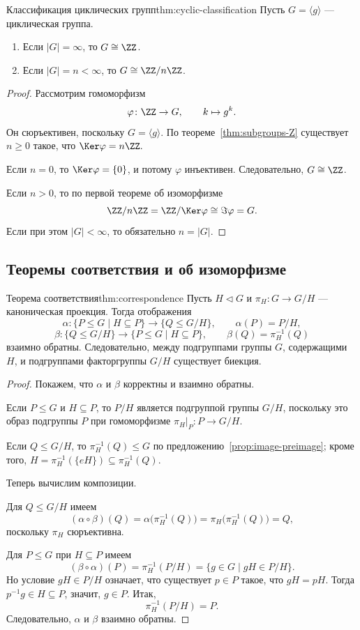 \begin{Theorem}{Классификация циклических групп}{thm:cyclic-classification}
	Пусть $G=\langle g\rangle$ --- циклическая группа.
	\begin{enumerate}
		\item Если $|G|=\infty$, то $G\cong \ZZ$.
		\item Если $|G|=n<\infty$, то $G\cong \ZZ/n\ZZ$.
	\end{enumerate}
\end{Theorem}

\begin{proof}
	Рассмотрим гомоморфизм
	\[
	\varphi\colon \ZZ \to G, \qquad k\mapsto g^k.
	\]
	Он сюръективен, поскольку $G=\langle g\rangle$. По теореме~\ref{thm:subgroups-Z} существует $n\ge 0$ такое, что $\Ker\varphi=n\ZZ.$

	Если $n=0$, то $\Ker\varphi=\{0\}$, и потому $\varphi$ инъективен. Следовательно, $G\cong \ZZ$.
	
	Если $n>0$, то по первой теореме об изоморфизме
	\[
	\ZZ/n\ZZ = \ZZ/\Ker\varphi \cong \Im\varphi = G.
	\]
	Если при этом $|G|<\infty$, то обязательно $n=|G|$.
\end{proof}

\subsection{Теоремы соответствия и об изоморфизме}

\begin{Theorem}{Теорема соответствия}{thm:correspondence}
	Пусть $H\triangleleft G$ и $\pi_H\colon G\to G/H$ --- каноническая проекция. Тогда отображения
	\[
	\alpha\colon \{P\le G\mid H\subseteq P\}\to \{Q\le G/H\}, \qquad \alpha(P)=P/H,
	\]
	\[
	\beta\colon \{Q\le G/H\}\to \{P\le G\mid H\subseteq P\}, \qquad \beta(Q)=\pi_H^{-1}(Q)
	\]
	взаимно обратны. Следовательно, между подгруппами группы $G$, содержащими $H$, и подгруппами факторгруппы $G/H$ существует биекция.
\end{Theorem}

\begin{proof}
	Покажем, что $\alpha$ и $\beta$ корректны и взаимно обратны.
	
	Если $P\le G$ и $H\subseteq P$, то $P/H$ является подгруппой группы $G/H$, поскольку это образ подгруппы $P$ при гомоморфизме $\pi_H|_P\colon P\to G/H$.
	
	Если $Q\le G/H$, то $\pi_H^{-1}(Q)\le G$ по предложению~\ref{prop:image-preimage}; кроме того, $H=\pi_H^{-1}(\{eH\})\subseteq \pi_H^{-1}(Q)$.
	
	Теперь вычислим композиции.
	
	Для $Q\le G/H$ имеем
	\[
	(\alpha\circ\beta)(Q)=\alpha\bigl(\pi_H^{-1}(Q)\bigr)=\pi_H\bigl(\pi_H^{-1}(Q)\bigr)=Q,
	\]
	поскольку $\pi_H$ сюръективна.
	
	Для $P\le G$ при $H\subseteq P$ имеем
	\[
	(\beta\circ\alpha)(P)=\pi_H^{-1}(P/H)=\{g\in G\mid gH\in P/H\}.
	\]
	Но условие $gH\in P/H$ означает, что существует $p\in P$ такое, что $gH=pH$. Тогда $p^{-1}g\in H\subseteq P$, значит, $g\in P$. Итак,
	\[
	\pi_H^{-1}(P/H)=P.
	\]
	Следовательно, $\alpha$ и $\beta$ взаимно обратны.
\end{proof}

